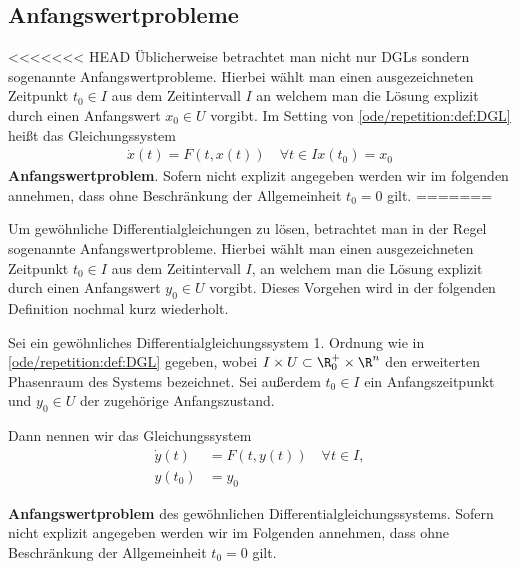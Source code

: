 \documentclass[letterpaper,10pt,english]{jupyterBook}
\begin{document}
\subsection{Anfangswertprobleme}
\label{\detokenize{ode/repetition:anfangswertprobleme}}
<<<<<<< HEAD
Üblicherweise betrachtet man nicht nur DGLs sondern sogenannte Anfangswertprobleme. Hierbei wählt man einen ausgezeichneten Zeitpunkt \(t_0\in I\) aus dem Zeitintervall \(I\) an welchem man die Lösung explizit durch einen Anfangswert \(x_0\in U\) vorgibt. Im Setting von \cref{ode/repetition:def:DGL} heißt
das Gleichungssystem
\begin{align}\label{equation:ode/repetition:eq:AWP}
\dot{x}(t) = F(t, x(t))\quad\forall t\in I
x(t_0) = x_0
\end{align}
\textbf{Anfangswertproblem}. Sofern nicht explizit angegeben werden wir im folgenden annehmen, dass ohne Beschränkung der Allgemeinheit \(t_0=0\) gilt.
=======
\par
Um gewöhnliche Differentialgleichungen zu lösen, betrachtet man in der Regel sogenannte Anfangswertprobleme.
Hierbei wählt man einen ausgezeichneten Zeitpunkt \(t_0\in I\) aus dem Zeitintervall \(I\), an welchem man die Lösung explizit durch einen Anfangswert \(y_0\in U\) vorgibt.
Dieses Vorgehen wird in der folgenden Definition nochmal kurz wiederholt.
\label{ode/repetition:def:anfangswertproblem}
\begin{definition}{}{}



\par
Sei ein gewöhnliches Differentialgleichungssystem 1. Ordnung wie in \cref{ode/repetition:def:DGL} gegeben, wobei \(I \times U \subset \R_0^+ \times \R^n\) den erweiterten Phasenraum des Systems bezeichnet.
Sei außerdem \(t_0 \in I\) ein Anfangszeitpunkt und \(y_0 \in U\) der zugehörige Anfangszustand.

\par
Dann nennen wir das Gleichungssystem
\begin{align}\label{equation:ode/repetition:eq:AWP}
\dot{y}(t) &= F(t, y(t))\quad\forall t\in I, \\
y(t_0) &= y_0
\end{align}
\par
\textbf{Anfangswertproblem} des gewöhnlichen Differentialgleichungssystems.
Sofern nicht explizit angegeben werden wir im Folgenden annehmen, dass ohne Beschränkung der Allgemeinheit \(t_0=0\) gilt.
\end{definition}
\end{document}
